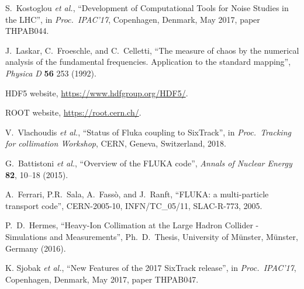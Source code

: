 \documentclass{ws-ijmpa}
\begin{document}
\begin{thebibliography}{99}
S.~Kostoglou {\it et al.}, ``Development of Computational Tools for Noise Studies in the LHC'', in \emph{Proc.~IPAC'17}, Copenhagen, Denmark, May 2017, paper THPAB044.

J.~Laskar, C.~Froeschle, and C.~Celletti, ``The measure of chaos by the numerical analysis of the fundamental frequencies. Application to the standard mapping'', \emph{Physica D} {\bf 56} 253 (1992).

 HDF5 website,
\url{https://www.hdfgroup.org/HDF5/}.

 ROOT website, 
\url{https://root.cern.ch/}.


V.~Vlachoudis \emph{et al.}, ``Status of Fluka coupling to SixTrack'', in \emph{Proc.~Tracking for collimation Workshop}, CERN, Geneva, Switzerland, 2018.
 

G.~Battistoni \emph{et al.}, ``Overview of the FLUKA code'',
\emph{Annals of Nuclear Energy} {\bf 82}, 10--18 (2015).
 
A.~Ferrari, P.R.~Sala, A.~Fass\`o, and J.~Ranft, ``FLUKA: a multi-particle transport code'', CERN-2005-10, INFN/TC\_05/11, SLAC-R-773, 2005.

P.~D.~Hermes, ``Heavy-Ion Collimation at the Large Hadron Collider - Simulations and Measurements'', Ph.~D.~Thesis, University of M\"{u}nster, M\"{u}nster, Germany (2016).

K. Sjobak {\it et al.}, ``New Features of the 2017 SixTrack release'', in \textit{Proc.~IPAC'17}, Copenhagen, Denmark, May 2017, paper THPAB047.





\end{thebibliography}
\end{document}
